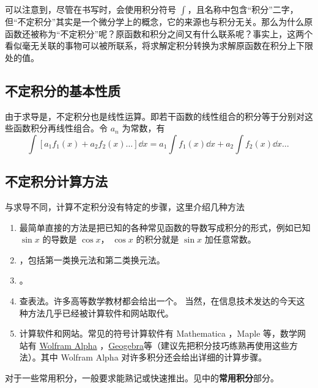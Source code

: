 可以注意到，尽管在书写时，会使用积分符号 $\int$，且名称中包含“积分”二字，但“不定积分”其实是一个微分学上的概念，它的来源也与积分无关。那么为什么原函数还被称为“不定积分”呢？原函数和积分之间又有什么联系呢？事实上，这两个看似毫无关联的事物可以被所联系，将求解定积分转换为求解原函数在积分上下限处的值。

\subsection{不定积分的基本性质}

由于求导是，不定积分也是线性运算。即若干函数的线性组合的积分等于分别对这些函数积分再线性组合。令 $a_n$ 为常数，有
\begin{equation}\label{eq_Int_4}
\int [a_1 f_1(x) + a_2 f_2(x)\dots] \dd{x}  = a_1 \int f_1(x) \dd{x} + a_2 \int f_2(x) \dd{x} \dots~
\end{equation}

\subsection{不定积分计算方法}
与求导不同，计算不定积分没有特定的步骤，这里介绍几种方法
\begin{enumerate}
\item 最简单直接的方法是把已知的各种常见函数的导数写成积分的形式，例如已知 $\sin x$ 的导数是 $\cos x$， $\cos x$ 的积分就是 $\sin x$ 加任意常数。
\item {}，包括第一类换元法和第二类换元法。

\item {}。

\item 查表法。许多高等数学教材都会给出一个。 当然，在信息技术发达的今天这种方法几乎已经被计算软件和网站取代。

\item 计算软件和网站。常见的符号计算软件有 Mathematica %
，Maple 等，数学网站有 \href{https://www.wolframalpha.com}{Wolfram Alpha}
，\href{https://www.geogebra.org}{Geogebra}等（建议先把积分技巧练熟再使用这些方法）。其中 Wolfram Alpha 对许多积分还会给出详细的计算步骤。
 \end{enumerate}

对于一些常用积分，一般要求能熟记或快速推出。见中的\textbf{常用积分}部分。
